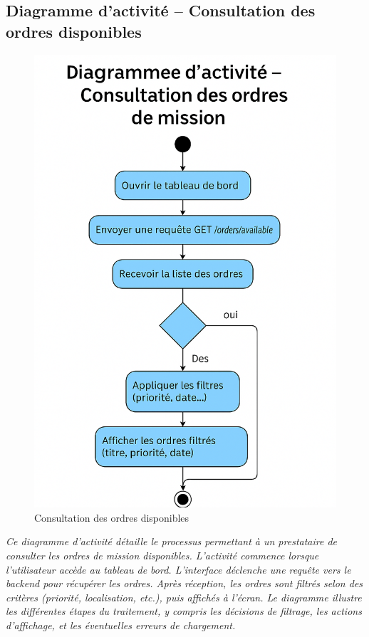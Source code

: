 \subsection*{Diagramme d’activité – Consultation des ordres disponibles}
\begin{figure}[H]
\centering
\includegraphics[width=0.85\linewidth]{figures/const ordres act.png}
\caption{Consultation des ordres disponibles}
\end{figure}

\textit{Ce diagramme d’activité détaille le processus permettant à un prestataire de consulter les ordres de mission disponibles. L’activité commence lorsque l’utilisateur accède au tableau de bord. L’interface déclenche une requête vers le backend pour récupérer les ordres. Après réception, les ordres sont filtrés selon des critères (priorité, localisation, etc.), puis affichés à l’écran. Le diagramme illustre les différentes étapes du traitement, y compris les décisions de filtrage, les actions d’affichage, et les éventuelles erreurs de chargement.}


